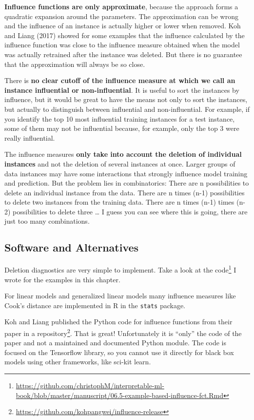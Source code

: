 \documentclass[12pt,]{krantz}
\renewcommand{\href}[2]{#2\footnote{\url{#1}}}
\begin{document}
\textbf{Influence functions are only approximate}, because the approach
forms a quadratic expansion around the parameters. The approximation can
be wrong and the influence of an instance is actually higher or lower
when removed. Koh and Liang (2017) showed for some examples that the
influence calculated by the influence function was close to the
influence measure obtained when the model was actually retrained after
the instance was deleted. But there is no guarantee that the
approximation will always be so close.

There is \textbf{no clear cutoff of the influence measure at which we
call an instance influential or non-influential}. It is useful to sort
the instances by influence, but it would be great to have the means not
only to sort the instances, but actually to distinguish between
influential and non-influential. For example, if you identify the top 10
most influential training instances for a test instance, some of them
may not be influential because, for example, only the top 3 were really
influential.

The influence measures \textbf{only take into account the deletion of
individual instances} and not the deletion of several instances at once.
Larger groups of data instances may have some interactions that strongly
influence model training and prediction. But the problem lies in
combinatorics: There are n possibilities to delete an individual
instance from the data. There are n times (n-1) possibilities to delete
two instances from the training data. There are n times (n-1) times
(n-2) possibilities to delete three \ldots{} I guess you can see where
this is going, there are just too many combinations.

\subsection{Software and
Alternatives}\label{software-and-alternatives-6}

Deletion diagnostics are very simple to implement. Take a look at
\href{https://github.com/christophM/interpretable-ml-book/blob/master/manuscript/06.5-example-based-influence-fct.Rmd}{the
code} I wrote for the examples in this chapter.

For linear models and generalized linear models many influence measures
like Cook's distance are implemented in R in the \texttt{stats} package.

Koh and Liang published the Python code for influence functions from
their paper \href{https://github.com/kohpangwei/influence-release}{in a
repository}. That is great! Unfortunately it is ``only'' the code of the
paper and not a maintained and documented Python module. The code is
focused on the Tensorflow library, so you cannot use it directly for
black box models using other frameworks, like sci-kit learn.
\end{document}

